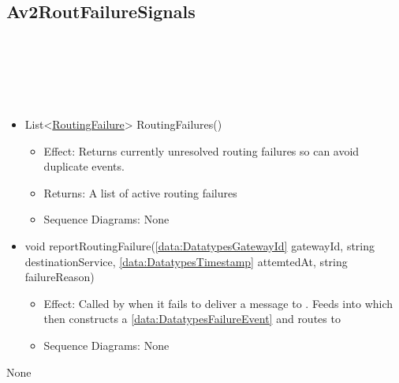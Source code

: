   \subsection{Av2RoutFailureSignals}\label{int:InterfacesAv2RoutFailureSignals}
    \begin{description}
      \item[Provided by:] \iconcomponent{}~
      \item[Required by:] \iconcomponent{}~ 
      \item[Operations:] ~
    \begin{itemize}[noitemsep,nolistsep,leftmargin=-.25cm]
      \item \textsf{List\textless{}{\colorbox{red!30}{\underline{RoutingFailure}}}\textgreater{} RoutingFailures()}
        \begin{itemize}[noitemsep,nolistsep]
           \item Effect: Returns currently unresolved routing failures so  can avoid duplicate events. 
           \item Returns: A list of active routing failures
           \item Sequence Diagrams: None
        \end{itemize}
      \item \textsf{void reportRoutingFailure(\ref{data:DatatypesGatewayId} gatewayId, string destinationService, \ref{data:DatatypesTimestamp} attemtedAt, string failureReason)}
        \begin{itemize}[noitemsep,nolistsep]
           \item Effect: Called by  when it fails to deliver a message to . Feeds into  which then constructs a \ref{data:DatatypesFailureEvent} and routes to  
           \item Sequence Diagrams: None
        \end{itemize}
    \end{itemize}
      \item[Diagrams:] None
    \end{description}

